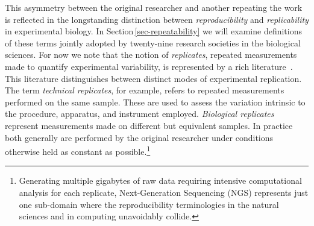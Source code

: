 This asymmetry between the original researcher and another repeating the work is reflected in the longstanding
	distinction between \emph{reproducibility} and \emph{replicability} in experimental biology.
In Section\,\ref{sec-repeatability} we will examine definitions of these terms jointly adopted by twenty-nine research
	societies in the biological sciences.
For now we note that the notion of \emph{replicates}, repeated measurements made to quantify
	experimental variability, is represented by a rich literature~\cite{robasky_role_2014}.
This literature distinguishes between distinct modes of experimental replication.
The term \emph{technical replicates}, for example, refers to repeated measurements performed on the same sample.
These are used to assess the variation intrinsic to the procedure, apparatus, and instrument employed.
\emph{Biological replicates} represent measurements made on different but equivalent samples.
In practice both generally are performed by the original researcher under conditions otherwise
	held as constant as possible.\footnote{Generating multiple gigabytes of raw data requiring
    intensive computational analysis for each replicate, Next-Generation Sequencing (NGS) represents
    just one sub-domain where the reproducibility
	terminologies in the natural sciences and in computing
        unavoidably collide.}

